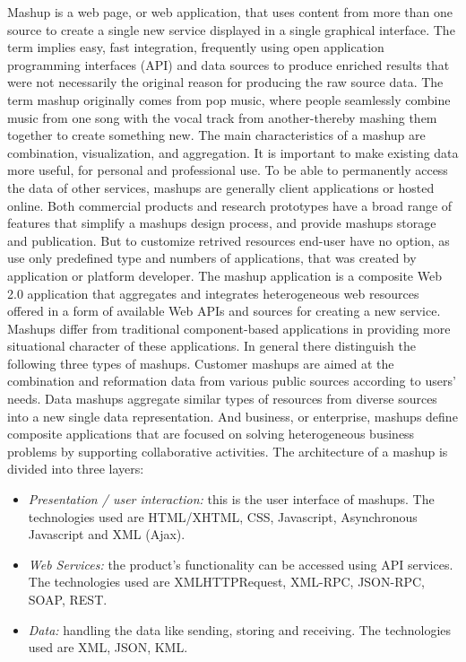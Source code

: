 		Mashup is a web page, or web application, that uses content from more than one source to create a single new service displayed in a single graphical interface. The term implies easy, fast integration, frequently using open application programming interfaces (API) and data sources to produce enriched results that were not necessarily the original reason for producing the raw source data. The term mashup originally comes from pop music, where people seamlessly combine music from one song with the vocal track from another-thereby mashing them together to create something new. The main characteristics of a mashup are combination, visualization, and aggregation. It is important to make existing data more useful, for personal and professional use. To be able to permanently access the data of other services, mashups are generally client applications or hosted online. Both commercial products and research prototypes have a broad range of features that simplify a mashups design process, and provide mashups storage and publication. But to customize retrived resources end-user have no option, as use only predefined type and numbers of applications, that was created by application or platform developer. 
		The mashup application is a composite Web 2.0 application that aggregates and integrates heterogeneous web resources offered in a form of available Web APIs and sources for creating a new service. Mashups differ from traditional component-based applications in providing more situational character of these applications\cite{yu2008understanding}. In general there distinguish the following three types of mashups\cite{ibrahim2012framework}. Customer mashups are aimed at the combination and reformation data from various public sources according to users’ needs. Data mashups aggregate similar types of resources from diverse sources into a new single data representation. And business, or enterprise, mashups define composite applications that are focused on solving heterogeneous business problems by supporting collaborative activities\cite{hoyer2008enterprise}. The architecture of a mashup is divided into three layers:
		 \newline
		 \begin{itemize}
		\item \emph{Presentation / user interaction:} this is the user interface of mashups. The technologies used are HTML/XHTML, CSS, Javascript, Asynchronous Javascript and XML (Ajax).
		\item \emph{Web Services:} the product's functionality can be accessed using API services. The technologies used are XMLHTTPRequest, XML-RPC, JSON-RPC, SOAP, REST.
		\item \emph{Data:} handling the data like sending, storing and receiving. The technologies used are XML, JSON, KML.
		\end{itemize}

